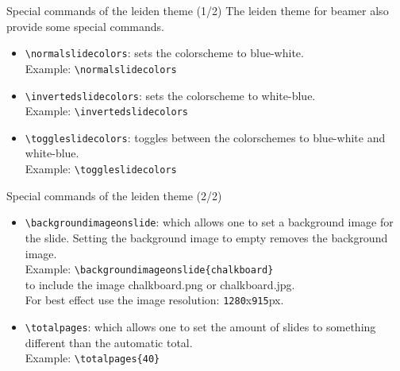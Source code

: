 \documentclass[t,11pt]{beamer}
\begin{document}
\begin{frame}[fragile]{Special commands of the leiden theme (1/2)}
The leiden theme for beamer also provide some special commands.
\begin{itemize}
\item	\alert{\texttt{\textbackslash normalslidecolors}}: sets the
		colorscheme to blue-white.\\
\vspace{0.1\baselineskip}
		Example: \verb|\normalslidecolors|\\
\vspace{0.5\baselineskip}

\item	\alert{\texttt{\textbackslash invertedslidecolors}}: sets the
		colorscheme to white-blue.\\
\vspace{0.1\baselineskip}
		Example: \verb|\invertedslidecolors|\\
\vspace{0.5\baselineskip}

\item	\alert{\texttt{\textbackslash toggleslidecolors}}: toggles between
		the colorschemes to blue-white and white-blue.\\
\vspace{0.1\baselineskip}
		Example: \verb|\toggleslidecolors|\\
\end{itemize}
\end{frame}

\begin{frame}[fragile]{Special commands of the leiden theme (2/2)}
\begin{itemize}
\item	\alert{\texttt{\textbackslash backgroundimageonslide}}: which
		allows one to set a background image for the slide.
		Setting the background image to empty removes the
		background image.\\
\vspace{0.2\baselineskip}
		Example: \verb|\backgroundimageonslide{chalkboard}|\\
\vspace{0.1\baselineskip}
		to include the image chalkboard.png or chalkboard.jpg.\\
		For best effect use the image resolution: \texttt{1280}x\texttt{915}px.
\vspace{0.5\baselineskip}

\item	\alert{\texttt{\textbackslash totalpages}}: which allows
		one to set the amount of slides to something different
		than the automatic total.\\
\vspace{0.2\baselineskip}
		Example: \verb|\totalpages{40}|
\end{itemize}
\end{frame}
\end{document}
